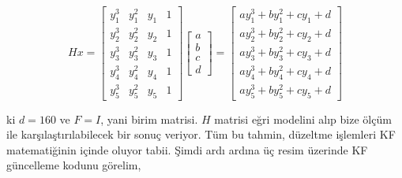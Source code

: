 \documentclass[12pt,fleqn]{article}\usepackage{../../common}
\begin{document}
$$ 
Hx = 
\left[\begin{array}{rrrr}
y_1^3 & y_1^2 & y_1 & 1 \\
y_2^3 & y_2^2 & y_2 & 1 \\
y_3^3 & y_3^2 & y_3 & 1 \\
y_4^3 & y_4^2 & y_4 & 1 \\
y_5^3 & y_5^2 & y_5 & 1 
\end{array}\right]
\left[\begin{array}{r} a \\ b \\ c \\ d  \end{array}\right]
= 
\left[\begin{array}{r}
a y_1^3 + b y_1^2 + c y_1 + d \\
a y_2^3 + b y_2^2 + c y_2 + d \\
a y_3^3 + b y_3^2 + c y_3 + d \\
a y_4^3 + b y_4^2 + c y_4 + d \\
a y_5^3 + b y_5^2 + c y_5 + d 
\end{array}\right]
$$

ki $d = 160$ ve $F = I$, yani birim matrisi. $H$ matrisi eğri modelini alıp
bize ölçüm ile karşılaştırılabilecek bir sonuç veriyor. Tüm bu tahmin,
düzeltme işlemleri KF matematiğinin içinde oluyor tabii. Şimdi ardı ardına
üç resim üzerinde KF güncelleme kodunu görelim,
\end{document}
